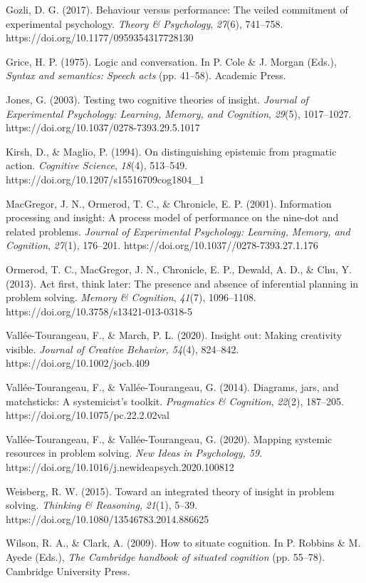 \documentclass{article}
\begin{document}
Gozli, D. G. (2017). Behaviour versus performance: The veiled commitment of experimental psychology. \emph{Theory \& Psychology}, \emph{27}(6), 741--758. https://doi.org/10.1177/0959354317728130

Grice, H. P. (1975). Logic and conversation. In P. Cole \& J. Morgan (Eds.), \emph{Syntax and semantics: Speech acts} (pp. 41--58). Academic Press.

Jones, G. (2003). Testing two cognitive theories of insight. \emph{Journal of Experimental Psychology: Learning, Memory, and Cognition}, \emph{29}(5), 1017--1027. https://doi.org/10.1037/0278-7393.29.5.1017

Kirsh, D., \& Maglio, P. (1994). On distinguishing epistemic from pragmatic action. \emph{Cognitive Science}, \emph{18}(4), 513--549. https://doi.org/10.1207/s15516709cog1804\_1

MacGregor, J. N., Ormerod, T. C., \& Chronicle, E. P. (2001). Information processing and insight: A process model of performance on the nine-dot and related problems. \emph{Journal of Experimental Psychology: Learning, Memory, and Cognition}, \emph{27}(1), 176--201. https://doi.org/10.1037//0278-7393.27.1.176

Ormerod, T. C., MacGregor, J. N., Chronicle, E. P., Dewald, A. D., \& Chu, Y. (2013). Act first, think later: The presence and absence of inferential planning in problem solving. \emph{Memory \& Cognition}, \emph{41}(7), 1096--1108. https://doi.org/10.3758/s13421-013-0318-5

Vallée-Tourangeau, F., \& March, P. L. (2020). Insight out: Making creativity visible. \emph{Journal of Creative Behavior, 54}(4), 824--842. https://doi.org/10.1002/jocb.409

Vallée-Tourangeau, F., \& Vallée-Tourangeau, G. (2014). Diagrams, jars, and matchsticks: A systemicist's toolkit. \emph{Pragmatics \& Cognition}, \emph{22}(2), 187--205. https://doi.org/10.1075/pc.22.2.02val

Vallée-Tourangeau, F., \& Vallée-Tourangeau, G. (2020). Mapping systemic resources in problem solving. \emph{New Ideas in Psychology, 59}. https://doi.org/10.1016/j.newideapsych.2020.100812

Weisberg, R. W. (2015). Toward an integrated theory of insight in problem solving. \emph{Thinking \& Reasoning}, \emph{21}(1), 5--39. https://doi.org/10.1080/13546783.2014.886625

Wilson, R. A., \& Clark, A. (2009). How to situate cognition. In P. Robbins \& M. Ayede (Eds.), \emph{The Cambridge handbook of situated cognition} (pp. 55--78). Cambridge University Press.
\end{document}
